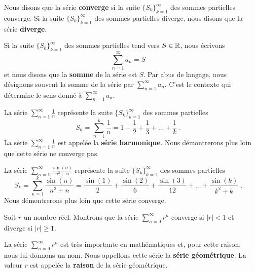 {\begin{focus}{\dfn}
Nous disons que la série {\bfseries converge}
si la suite $\displaystyle \{S_k\}_{k=1}^\infty$ des sommes partielles
converge.  Si la suite $\{S_k\}_{k=1}^\infty$ des sommes partielles
diverge, nous disons que la série {\bfseries diverge}.

Si la suite $\{S_k\}_{k=1}^\infty$ des sommes partielles tend vers
$S \in \mathbb{R}$, nous écrivons
\[
\sum_{n=1}^\infty a_n = S
\]
et nous disons que la {\bfseries somme} de la série est $S$.  Par abus
de langage, nous désignons souvent la somme de la série par
$\displaystyle \sum_{n=1}^\infty a_n$.  C'est le contexte qui
détermine le sens donné à $\displaystyle \sum_{n=1}^\infty a_n$.
\end{focus}

\begin{egg}
La série $\displaystyle \sum_{n=1}^\infty \frac{1}{n}$ représente la
suite $\{S_k\}_{k=1}^\infty$ des sommes partielles
\[
S_k = \sum_{n=1}^k \frac{1}{n} = 1 + \frac{1}{2} + \frac{1}{3} + \ldots
  + \frac{1}{k} \; .
\]
La série $\displaystyle \sum_{n=1}^\infty \frac{1}{n}$ est appelée la
{\bfseries série harmonique}.
Nous démontrerons plus loin que cette série ne converge pas.

La série $\displaystyle \sum_{n=1}^\infty \frac{\sin(n)}{n^2+n}$
représente la suite $\{S_k\}_{k=1}^\infty$ des sommes partielles
\[
S_k = \sum_{n=1}^k \frac{\sin(n)}{n^2+n}
= \frac{\sin(1)}{2} + \frac{\sin(2)}{6} + \frac{\sin(3)}{12} + \ldots
  + \frac{\sin(k)}{k^2+k} \; .
\]
Nous démontrerons plus loin que cette série converge.
\end{egg}

\begin{egg}
Soit $r$ un nombre réel.  Montrons que la série
$\displaystyle \sum_{n=0}^\infty r^n$ converge si $|r|<1$ et diverge
si $|r|\geq 1$.

La série $\displaystyle \sum_{n=0}^\infty r^n$ est
très importante en mathématiques et, pour cette raison, nous lui donnons
un nom.  Nous appellons cette série la {\bfseries série géométrique}.
 La valeur $r$ est appelée la
{\bfseries raison} de la série géométrique.


\end{egg}}
